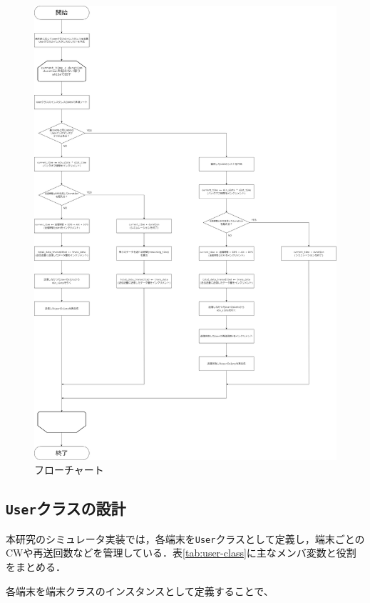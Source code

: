\documentclass[a4paper,10pt]{ltjsarticle}
\begin{document}
\begin{figure}[H]
  \centering
  \includegraphics[width=1\textwidth]{./assets/flowchart.drawio.png}
  \caption{フローチャート}
  \label{flowchart}
\end{figure}



\subsection{\texttt{User}クラスの設計}
本研究のシミュレータ実装では，各端末を\texttt{User}クラスとして定義し，端末ごとのCWや再送回数などを管理している．表\ref{tab:user-class}に主なメンバ変数と役割をまとめる．

各端末を端末クラスのインスタンスとして定義することで、
\end{document}
